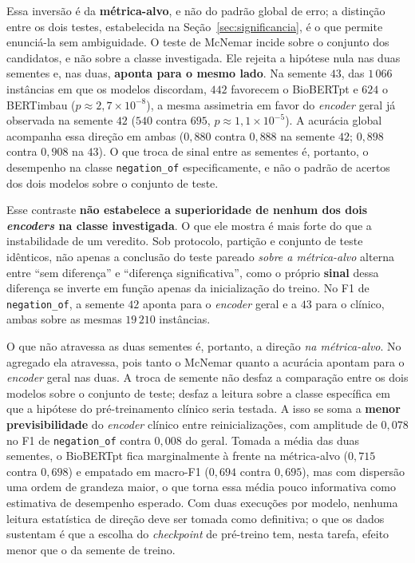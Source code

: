 Essa inversão é da \textbf{métrica-alvo}, e não do padrão global de erro; a
distinção entre os dois testes, estabelecida na Seção~\ref{sec:significancia}, é o
que permite enunciá-la sem ambiguidade. O teste de McNemar incide sobre o conjunto
dos candidatos, e não sobre a classe investigada. Ele rejeita a hipótese nula nas
duas sementes e, nas duas, \textbf{aponta para o mesmo lado}. Na semente $43$, das
$1\,066$ instâncias em que os modelos discordam, $442$ favorecem o BioBERTpt e
$624$ o BERTimbau ($p \approx 2{,}7\times10^{-8}$), a mesma assimetria em favor
do \emph{encoder} geral já observada na semente $42$ ($540$ contra $695$,
$p \approx 1{,}1\times10^{-5}$). A acurácia global acompanha essa direção em ambas
($0{,}880$ contra $0{,}888$ na semente $42$; $0{,}898$ contra $0{,}908$ na $43$).
O que troca de sinal entre as sementes é, portanto, o desempenho na classe
\texttt{negation\_of} especificamente, e não o padrão de acertos dos dois modelos
sobre o conjunto de teste.

Esse contraste \textbf{não estabelece a superioridade de nenhum dos dois
\emph{encoders} na classe investigada}. O que ele mostra é mais forte do que a
instabilidade de um veredito. Sob protocolo, partição e conjunto de teste
idênticos, não apenas a conclusão do teste pareado \emph{sobre a métrica-alvo}
alterna entre ``sem diferença'' e ``diferença significativa'', como o próprio
\textbf{sinal} dessa diferença se inverte em função apenas da inicialização do
treino. No F1 de \texttt{negation\_of}, a semente $42$ aponta para o
\emph{encoder} geral e a $43$ para o clínico, ambas sobre as mesmas $19\,210$
instâncias.

O que não atravessa as duas sementes é, portanto, a direção \emph{na métrica-alvo}.
No agregado ela atravessa, pois tanto o McNemar quanto a acurácia apontam para o
\emph{encoder} geral nas duas. A troca de semente não desfaz a comparação entre os
dois modelos sobre o conjunto de teste; desfaz a leitura sobre a classe específica
em que a hipótese do pré-treinamento clínico seria testada. A isso se soma a
\textbf{menor previsibilidade} do \emph{encoder} clínico entre reinicializações,
com amplitude de $0{,}078$ no F1 de \texttt{negation\_of} contra $0{,}008$ do geral.
Tomada a média das duas sementes, o BioBERTpt fica marginalmente à frente na
métrica-alvo ($0{,}715$ contra $0{,}698$) e empatado em macro-F1 ($0{,}694$
contra $0{,}695$),
mas com dispersão uma ordem de grandeza maior, o que torna essa média pouco
informativa como estimativa de desempenho esperado. Com duas execuções por modelo,
nenhuma leitura estatística de direção deve ser tomada como definitiva; o que os
dados sustentam é que a escolha do \emph{checkpoint} de pré-treino tem, nesta
tarefa, efeito menor que o da semente de treino.
